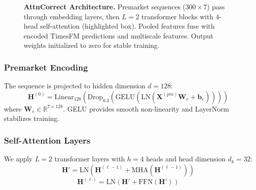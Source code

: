 \documentclass[10pt,conference]{IEEEtran}
\newcommand{\rev}[1]{#1}
\begin{document}
\begin{figure}[t]
{
}
\caption{\textbf{AttnCorrect Architecture.} Premarket sequences ($300 \times 7$) pass through embedding layers, then $L{=}2$ transformer blocks with 4-head self-attention (highlighted box). Pooled features fuse with encoded TimesFM predictions and multiscale features. Output weights initialized to zero \cite{zhang2019fixup} for stable training.}
\label{fig:attn_arch}
\end{figure}

\subsubsection{Premarket Encoding}

The sequence is projected to hidden dimension $d = 128$:
\begin{equation}
\mathbf{H}^{(0)} = \text{Linear}_{128}(\text{Drop}_{0.3}(\text{GELU}(\text{LN}(\mathbf{X}^{(pm)} \mathbf{W}_e + \mathbf{b}_e))))
\end{equation}
where $\mathbf{W}_e \in \mathbb{R}^{7 \times 128}$. GELU \cite{hendrycks2016gaussian} provides smooth non-linearity and LayerNorm \cite{ba2016layer} stabilizes training.

\subsubsection{Self-Attention Layers}

We apply $L = 2$ transformer layers with $h = 4$ heads and head dimension $d_k = 32$:
\begin{equation}
    \mathbf{H}' = \text{LN}(\mathbf{H}^{(\ell-1)} + \text{MHA}(\mathbf{H}^{(\ell-1)}))
\end{equation}
\begin{equation}
    \mathbf{H}^{(\ell)} = \text{LN}(\mathbf{H}' + \text{FFN}(\mathbf{H}'))
\end{equation}
\end{document}
